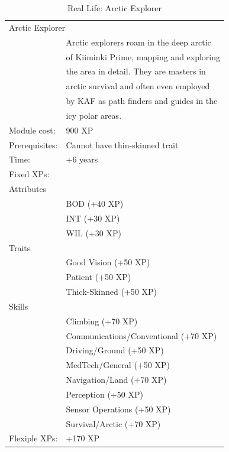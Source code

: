 \documentclass{tufte-book}
\begin{document}
\bigskip
\begin{table}
\begin{minipage}{\textwidth}
\begin{center}
\begin{tabular}{ll}
\toprule
\multicolumn{2}{l}{Arctic Explorer} \\

\multirow{6}{*}[0.75em]{} & Arctic explorers roam in the deep arctic \\
                          & of Kiiminki Prime, mapping and exploring \\
                          & the area in detail. They are masters in  \\
                          & arctic survival and often even employed  \\
                          & by KAF as path finders and guides in the \\
                          & icy polar areas.                         \\


Module cost: & 900 XP \\
Prerequisites: & Cannot have thin-skinned trait \\
Time: & +6 years \\
Fixed XPs: & \\
\quad Attributes & \\
& BOD (+40 XP) \\
& INT (+30 XP) \\
& WIL (+30 XP) \\
\quad Traits & \\
& Good Vision (+50 XP) \\
& Patient (+50 XP) \\
& Thick-Skinned (+50 XP) \\
\quad Skills & \\
& Climbing (+70 XP) \\
& Communications/Conventional (+70 XP) \\
& Driving/Ground (+50 XP) \\
& MedTech/General (+50 XP) \\
& Navigation/Land (+70 XP) \\
& Perception (+50 XP) \\
& Sensor Operations (+50 XP) \\
& Survival/Arctic (+70 XP) \\
Flexiple XPs: & +170 XP \\

\bottomrule
\end{tabular}
\end{center}
\end{minipage}
\caption{Real Life: Arctic Explorer}
\end{table}
\end{document}
